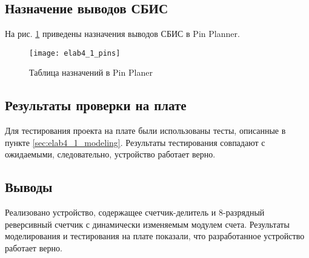 \subsection{Назначение выводов СБИС}

На рис. \ref{fig:elab4_1_pins} приведены назначения выводов СБИС в Pin Planner.

\begin{figure}[H]
\begin{center}
	\texttt{[image: elab4\_1\_pins]}
	\caption{Таблица назначений в Pin Planer}
	\label{fig:elab4_1_pins}
\end{center}
\end{figure}

\subsection{Результаты проверки на плате}

Для тестирования проекта на плате были использованы тесты, описанные в пункте \ref{sec:elab4_1_modeling}. Результаты тестирования совпадают с ожидаемыми, следовательно, устройство работает верно.

\subsection{Выводы}

Реализовано устройство, содержащее счетчик-делитель и 8-разрядный реверсивный счетчик с динамически изменяемым модулем счета. Результаты моделирования и тестирования на плате показали, что разработанное устройство работает верно.


